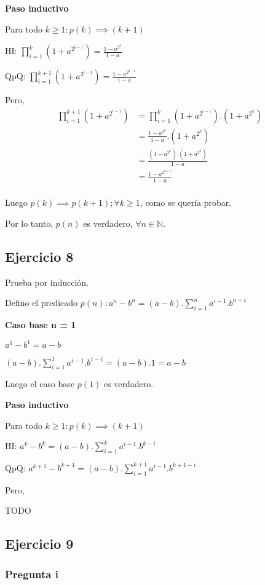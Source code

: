 \textbf{Paso inductivo}

Para todo $k \geq 1: p(k) \implies (k+1)$

HI: $\prod_{i=1}^{k}\left(1+a^{2^{i-1}}\right)= \frac{1-a^{2^k}}{1-a}$

QpQ: $\prod_{i=1}^{k+1}\left(1+a^{2^{i-1}}\right)= \frac{1-a^{2^{k+1}}}{1-a}$

Pero,
\begin{align*}
    \prod_{i=1}^{k+1}\left(1+a^{2^{i-1}}\right) &= \prod_{i=1}^{k}\left(1+a^{2^{i-1}}\right) . (1+a^{2^k}) \\
    &= \frac{1-a^{2^k}}{1-a} . (1+a^{2^k}) \\
    &= \frac{\left(1-a^{2^k}\right).\left(1+a^{2^k}\right)}{1-a} \\
    &= \frac{1-a^{2^{k+1}}}{1-a} \\
\end{align*}

Luego $p(k) \implies p(k+1); \forall k \geq 1$, como se quería probar.

Por lo tanto, $p(n)$ es verdadero, $\forall n \in \mathbb{N}$.

\subsection{Ejercicio 8}

Prueba por inducción.

Defino el predicado $p(n) : a^n - b^n = (a-b).\sum_{i=1}^{n}a^{i-1}.b^{n-i}$

\textbf{Caso base n = 1}

$ a^1 - b^1 = a-b$

$ (a-b).\sum_{i=1}^{1}a^{i-1}.b^{1-i} = (a-b).1 = a-b$

Luego el caso base $p(1)$ es verdadero.

\textbf{Paso inductivo}

Para todo $k \geq 1: p(k) \implies (k+1)$

HI: $a^k - b^k = (a-b).\sum_{i=1}^{k}a^{i-1}.b^{k-i}$

QpQ: $a^{k+1} - b^{k+1} = (a-b).\sum_{i=1}^{k+1}a^{i-1}.b^{k+1-i}$

Pero,

TODO
\subsection{Ejercicio 9}

\subsubsection{Pregunta i}

